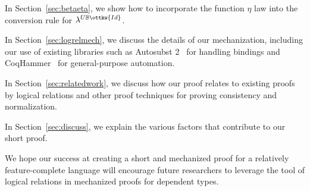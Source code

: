 \documentclass[acmsmall,screen=true,
\ifpublic review=false\else,review=true\fi
  ,anonymous=\ifanonymous true\else false\fi]{acmart}
\newcommand{\lang}{$\lambda^{U\mathbb{B}\ottkw{Id}}$\xspace}
\newcommand{\scw}[1]{}
\begin{document}
In Section~\ref{sec:betaeta}, we show how to incorporate the function $\eta$ law
into the conversion rule for \lang{}.

In Section~\ref{sec:logrelmech}, we discuss the details of our
mechanization, including our use of existing libraries such as
Autosubst 2~\citep{autosubst2} for handling bindings and
CoqHammer~\citep{czajka2018hammer} for general-purpose automation.

In Section~\ref{sec:relatedwork}, we discuss how our proof relates to
existing proofs by logical relations and other proof techniques for
proving consistency and normalization.

In Section~\ref{sec:discuss}, we explain the various factors that contribute
to our short proof.

We hope our success at creating a short and mechanized proof for a
relatively feature-complete language will encourage future researchers
to leverage the tool of logical relations in mechanized
proofs for dependent types.

\scw{TODO: this introduction is still not done. At this point, I think the
  first part has gotten a little long. We could say what we mean more
  concisely. We also need to work on the overview at the end of this section
  --- it need to be more descriptive about contributions and less of a table
  of contents.}









\end{document}
